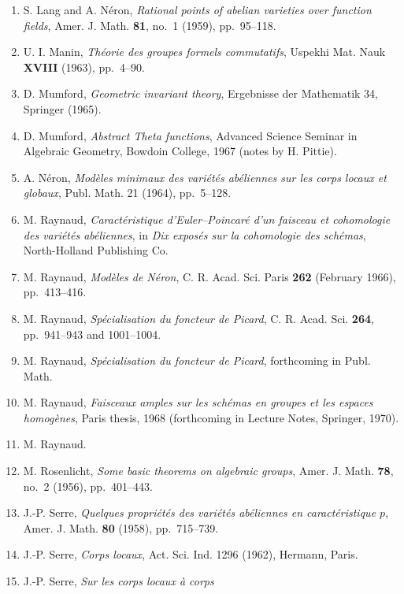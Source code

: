 \begin{enumerate}
  no.~7 (1959).
\item[{[16]}] S. Lang and A. N\'{e}ron, \emph{Rational points of abelian
  varieties over function fields}, Amer. J. Math. \textbf{81}, no.~1
  (1959), pp.~95--118.
\item[{[16bis]}] U. I. Manin, \emph{Th\'{e}orie des groupes formels
  commutatifs}, Uspekhi Mat. Nauk \textbf{XVIII} (1963), pp.~4--90.
\item[{[17]}] D. Mumford, \emph{Geometric invariant theory}, Ergebnisse
  der Mathematik 34, Springer (1965).
\item[{[18]}] D. Mumford, \emph{Abstract Theta functions}, Advanced
  Science Seminar in Algebraic Geometry, Bowdoin College, 1967 (notes by
  H. Pittie).
\item[{[19]}] A. N\'{e}ron, \emph{Mod\`{e}les minimaux des vari\'{e}t\'{e}s
  ab\'{e}liennes sur les corps locaux et globaux}, Publ. Math. 21 (1964),
  pp.~5--128.
\item[{[20]}] M. Raynaud, \emph{Caract\'{e}ristique d'Euler--Poincar\'{e}
  d'un faisceau et cohomologie des vari\'{e}t\'{e}s ab\'{e}liennes}, in
  \emph{Dix expos\'{e}s sur la cohomologie des sch\'{e}mas}, North-Holland
  Publishing Co.
\item[{[21]}] M. Raynaud, \emph{Mod\`{e}les de N\'{e}ron}, C. R. Acad.
  Sci. Paris \textbf{262} (February 1966), pp.~413--416.
\item[{[22]}] M. Raynaud, \emph{Sp\'{e}cialisation du foncteur de Picard},
  C. R. Acad. Sci. \textbf{264}, pp.~941--943 and 1001--1004.
\item[{[22bis]}] M. Raynaud, \emph{Sp\'{e}cialisation du foncteur de
  Picard}, forthcoming in Publ. Math.
\item[{[23]}] M. Raynaud, \emph{Faisceaux amples sur les sch\'{e}mas en
  groupes et les espaces homog\`{e}nes}, Paris thesis, 1968 (forthcoming
  in Lecture Notes, Springer, 1970).
\item[{[24]}] M. Raynaud.
\item[{[25]}] M. Rosenlicht, \emph{Some basic theorems on algebraic
  groups}, Amer. J. Math. \textbf{78}, no.~2 (1956), pp.~401--443.
\item[{[25bis]}] J.-P. Serre, \emph{Quelques propri\'{e}t\'{e}s des
  vari\'{e}t\'{e}s ab\'{e}liennes en caract\'{e}ristique $p$}, Amer. J.
  Math. \textbf{80} (1958), pp.~715--739.
\item[{[26]}] J.-P. Serre, \emph{Corps locaux}, Act. Sci. Ind. 1296
  (1962), Hermann, Paris.
\item[{[27]}] J.-P. Serre, \emph{Sur les corps locaux \`{a} corps
}
\end{enumerate}
